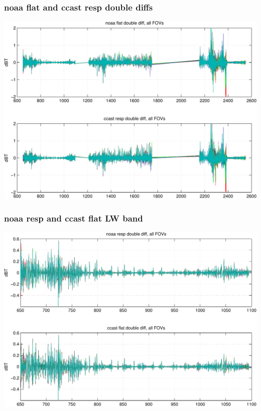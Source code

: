 \documentclass[11pt]{beamer}
\begin{document}
\begin{frame}
\frametitle{noaa flat and ccast resp double diffs}
\begin{center}
  \includegraphics[scale=0.5]{figures/cal_ddif_2.pdf}
\end{center}
\end{frame}
\begin{frame}
\frametitle{noaa resp and ccast flat LW band}
\begin{center}
  \includegraphics[scale=0.5]{figures/ddif_LW_band.pdf}
\end{center}
\end{frame}
\end{document}
